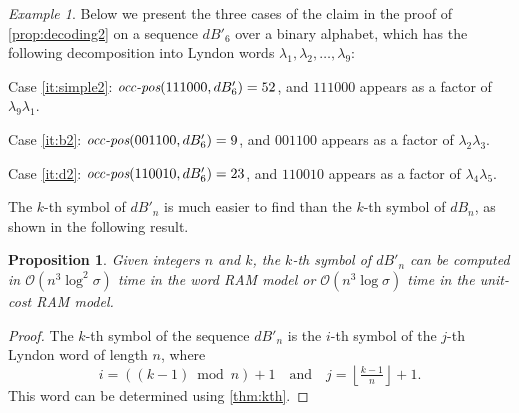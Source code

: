 \documentclass{article}
\newcommand{\Oh}{\mathcal{O}}
\newcommand{\floor}[1]{\left\lfloor #1 \right\rfloor}
\newcommand{\dB}{dB}
\newcommand{\occ}{\mbox{\it occ-pos}}
\newtheorem{proposition}[theorem]{Proposition}
\theoremstyle{definition}
\theoremstyle{remark}
\newtheorem{example}[theorem]{Example}
\begin{document}
\begin{example}
  Below we present the three cases of the claim in the proof of \cref{prop:decoding2}
  on a sequence $\dB'_6$ over a binary alphabet, which has the following
  decomposition into Lyndon words $\lambda_1,\lambda_2,\ldots, \lambda_{9}$:

  \medskip
  \begin{center}
  \end{center}
  \begin{description}
    \item{Case \ref{it:simple2}:}
      $\occ(111000,\dB'_6)=52$, and $111000$ appears as a factor of $\lambda_{9}\lambda_1$.
    \item{Case \ref{it:b2}:}
      $\occ(001100,\dB'_6)=9$, and $001100$ appears as a factor of $\lambda_2\lambda_3$.
    \item{Case \ref{it:d2}:}
      $\occ(110010,\dB'_6)=23$, and $110010$ appears as a factor of $\lambda_4\lambda_5$.
  \end{description}
\end{example}

The $k$-th symbol of $\dB'_n$ is much easier to find than the $k$-th symbol of $\dB_n$,
as shown in the following result.
\begin{proposition}\label{prop:random-access2}
  Given integers $n$ and $k$, the $k$-th symbol of $\dB'_n$ can be computed
  in $\Oh(n^3\log^2\sigma)$ time in the word RAM model or $\Oh(n^3 \log\sigma)$ time in the unit-cost RAM model.
\end{proposition}
\begin{proof}
  The $k$-th symbol of the sequence $\dB'_n$ is the
  $i$-th symbol of the $j$-th Lyndon word of length $n$, where
  $$i=((k-1)\bmod n)+1 \quad\mbox{and}\quad j=\floor{\tfrac{k-1}{n}}+1.$$
  This word can be determined using \cref{thm:kth}.
\end{proof}
\end{document}
